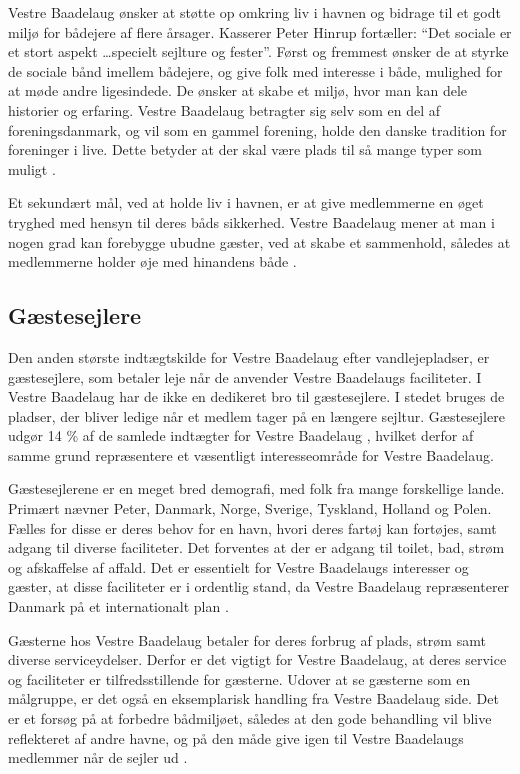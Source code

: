 Vestre Baadelaug ønsker at støtte op omkring liv i havnen og bidrage til et godt miljø for bådejere af flere årsager. Kasserer Peter Hinrup fortæller: \enquote{Det sociale er et stort aspekt \ldots specielt sejlture og fester}. Først og fremmest ønsker de at styrke de sociale bånd imellem bådejere, og give folk med interesse i både, mulighed for at møde andre ligesindede. De ønsker at skabe et miljø, hvor man kan dele historier og erfaring. Vestre Baadelaug betragter sig selv som en del af foreningsdanmark, og vil som en gammel forening, holde den danske tradition for foreninger i live. Dette betyder at der skal være plads til så mange typer som muligt \cite{int_vb_sl}.

Et sekundært mål, ved at holde liv i havnen, er at give medlemmerne en øget tryghed med hensyn til deres båds sikkerhed. Vestre Baadelaug mener at man i nogen grad kan forebygge ubudne gæster, ved at skabe et sammenhold, således at medlemmerne holder øje med hinandens både \cite{int_vb_sl}.


\subsection{Gæstesejlere}\label{sec:gaste}

Den anden største indtægtskilde for Vestre Baadelaug efter vandlejepladser, er gæstesejlere, som betaler leje når de anvender Vestre Baadelaugs faciliteter. I Vestre Baadelaug har de ikke en dedikeret bro til gæstesejlere. I stedet bruges de pladser, der bliver ledige når et medlem tager på en længere sejltur. Gæstesejlere udgør 14 \% af de samlede indtægter for Vestre Baadelaug \cite{vestre_arsregnskab}, hvilket derfor af samme grund repræsentere et væsentligt interesseområde for Vestre Baadelaug.

Gæstesejlerene er en meget bred demografi, med folk fra mange forskellige lande. Primært nævner Peter, Danmark, Norge, Sverige, Tyskland, Holland og Polen. Fælles for disse er deres behov for en havn, hvori deres fartøj kan fortøjes, samt adgang til diverse faciliteter. Det forventes at der er adgang til toilet, bad, strøm og afskaffelse af affald. Det er essentielt for Vestre Baadelaugs interesser og gæster, at disse faciliteter er i ordentlig stand, da Vestre Baadelaug repræsenterer Danmark på et internationalt plan \cite{int_vb_sl}.

Gæsterne hos Vestre Baadelaug betaler for deres forbrug af plads, strøm samt diverse serviceydelser. Derfor er det vigtigt for Vestre Baadelaug, at deres service og faciliteter er tilfredsstillende for gæsterne. Udover at se gæsterne som en målgruppe, er det også en eksemplarisk handling fra Vestre Baadelaug side. Det er et forsøg på at forbedre bådmiljøet, således at den gode behandling vil blive reflekteret af andre havne, og på den måde give igen til Vestre Baadelaugs medlemmer når de sejler ud \cite{int_vb_sl}.


